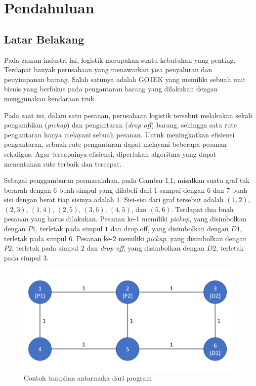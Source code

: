 \chapter{Pendahuluan}

\section{Latar Belakang}

Pada zaman industri ini, logistik merupakan suatu kebutuhan yang penting. Terdapat banyak 
perusahaan yang menawarkan jasa penyaluran dan penyimpanan barang. Salah satunya adalah 
GOJEK yang memiliki sebuah unit bisnis yang berfokus pada pengantaran barang yang 
dilakukan dengan menggunakan kendaraan truk.

Pada saat ini, dalam satu pesanan, perusahaan logistik tersebut melakukan sekali pengambilan 
(\textit{pickup}) dan pengantaran (\textit{drop off}) barang, sehingga satu rute pengantaran 
hanya melayani sebuah pesanan. Untuk meningkatkan efisiensi pengantaran, sebuah rute 
pengantaran dapat melayani beberapa pesanan sekaligus. Agar tercapainya efisiensi, 
diperlukan algoritma yang dapat menentukan rute terbaik dan tercepat.

Sebagai penggambaran permasalahan, pada Gambar I.1, misalkan suatu graf tak berarah dengan 
$6$ buah simpul yang dilabeli dari $1$ sampai dengan $6$ dan $7$ buah sisi dengan berat 
tiap sisinya adalah $1$. Sisi-sisi dari graf tersebut adalah $(1,2)$, $(2,3)$, $(1,4)$, 
$(2,5)$, $(3,6)$, $(4,5)$, dan $(5,6)$. Terdapat dua buah pesanan yang harus dilakukan. 
Pesanan ke-1 memiliki \textit{pickup}, yang disimbolkan dengan $P1$, terletak pada simpul 
$1$ dan drop off, yang disimbolkan dengan $D1$, terletak pada simpul $6$. Pesanan ke-2 
memiliki \textit{pickup}, yang disimbolkan dengan $P2$, terletak pada simpul $2$ dan 
\textit{drop off}, yang disimbolkan dengan $D2$, terletak pada simpul $3$.

\begin{figure}[H]
  \centering
  \includegraphics[width=1.0\textwidth]{resources/graph_init.png}
  \caption{Contoh tampilan antarmuka dari program}
\end{figure}

